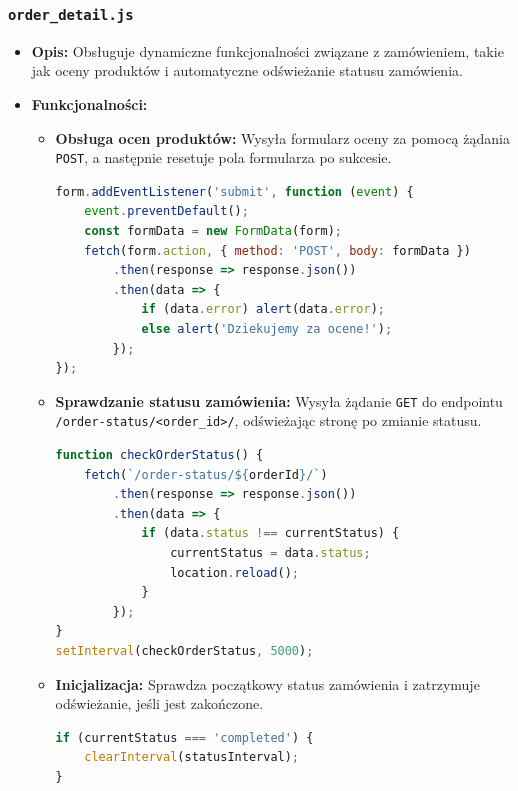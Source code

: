 \documentclass[12pt,a4paper,oneside]{article}
\theoremstyle{definition}
\numberwithin{equation}{section}
\begin{document}
\subsubsection*{\texttt{order\_detail.js}}
\begin{itemize}
    \item \textbf{Opis:} 
    Obsługuje dynamiczne funkcjonalności związane z zamówieniem, takie jak oceny produktów i automatyczne odświeżanie statusu zamówienia.
    \item \textbf{Funkcjonalności:}
    \begin{itemize}
        \item \textbf{Obsługa ocen produktów:}
        Wysyła formularz oceny za pomocą żądania \texttt{POST}, a następnie resetuje pola formularza po sukcesie.
        \begin{lstlisting}[language=JavaScript]
form.addEventListener('submit', function (event) {
    event.preventDefault();
    const formData = new FormData(form);
    fetch(form.action, { method: 'POST', body: formData })
        .then(response => response.json())
        .then(data => {
            if (data.error) alert(data.error);
            else alert('Dziekujemy za ocene!');
        });
});
        \end{lstlisting}
        \item \textbf{Sprawdzanie statusu zamówienia:}
            \subitem Wysyła żądanie \texttt{GET} do endpointu \texttt{/order-status/<order\_id>/},
            \subsubitem odświeżając stronę po zmianie statusu.
        \begin{lstlisting}[language=JavaScript]
function checkOrderStatus() {
    fetch(`/order-status/${orderId}/`)
        .then(response => response.json())
        .then(data => {
            if (data.status !== currentStatus) {
                currentStatus = data.status;
                location.reload();
            }
        });
}
setInterval(checkOrderStatus, 5000);
        \end{lstlisting}
        \item \textbf{Inicjalizacja:} Sprawdza początkowy status zamówienia i zatrzymuje odświeżanie, jeśli jest zakończone.
        \begin{lstlisting}[language=JavaScript]
if (currentStatus === 'completed') {
    clearInterval(statusInterval);
}
        \end{lstlisting}
    \end{itemize}
\end{itemize}


% 
% 
\end{document}
